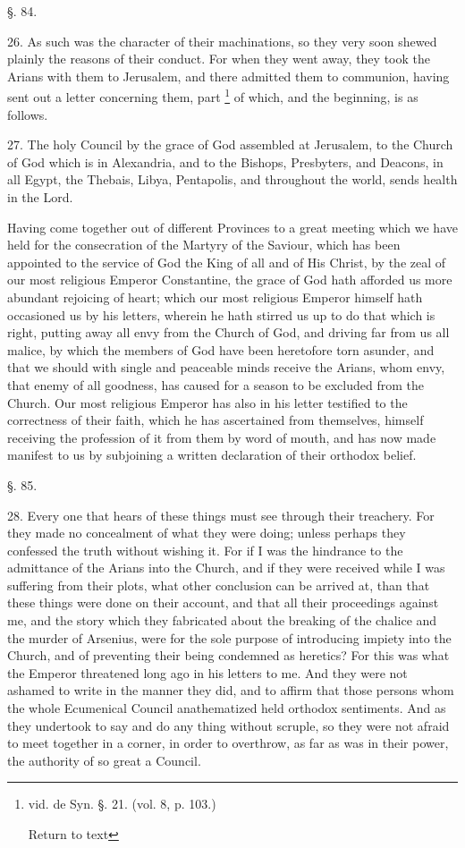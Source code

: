 §. 84.

26. As such was the character of their
machinations, so they very soon shewed plainly the reasons of their
conduct. For when they went away, they took the Arians with them to
Jerusalem, and there admitted them to communion, having sent out a
letter concerning them, part \footnote{vid. de Syn. §. 21. (vol. 8, p. 103.)

Return to text} of which, and the beginning, is as follows.

27. The holy Council by the grace of God
assembled at Jerusalem, to the Church of God which is in Alexandria,
and to the Bishops, Presbyters, and Deacons, in all Egypt, the Thebais,
Libya, Pentapolis, and throughout the world, sends health in the Lord.

Having come together out of different Provinces
to a great meeting which we have held for the consecration of the
Martyry of the Saviour, which has been appointed to the service of God
the King of all and of His Christ, by the zeal of our most religious
Emperor Constantine, the grace of God hath afforded us more abundant
rejoicing of heart; which our most religious Emperor himself hath
occasioned us by his letters, wherein he hath stirred us up to do that
which is right, putting away all envy from the Church of God, and
driving far from us all malice, by which the members of God have been
heretofore torn asunder, and that we should with single and peaceable
minds receive the Arians, whom envy, that enemy of all goodness, has
caused for a season to be excluded from the Church. Our most
religious Emperor has also in his letter testified to the correctness
of their faith, which he has ascertained from themselves, himself
receiving the profession of it from them by word of mouth, and has now
made manifest to us by subjoining a written declaration of their
orthodox belief.

§. 85.

28. Every one that hears of these things must see
through their treachery. For they made no concealment of what they
were doing; unless perhaps they confessed the truth without wishing
it. For if I was the hindrance to the admittance of the Arians into
the Church, and if they were received while I was suffering from their
plots, what other conclusion can be arrived at, than that these things
were done on their account, and that all their proceedings against me,
and the story which they fabricated about the breaking of the chalice
and the murder of Arsenius, were for the sole purpose of introducing
impiety into the Church, and of preventing their being condemned as
heretics? For this was what the Emperor threatened long ago in his
letters to me. And they were not ashamed to write in the manner they
did, and to affirm that those persons whom the whole Ecumenical
Council anathematized held orthodox sentiments. And as they undertook
to say and do any thing without scruple, so they were not afraid to
meet together in a corner, in order to overthrow, as far as was in
their power, the authority of so great a Council.

